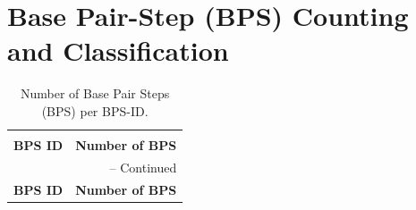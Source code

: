 \section{Base Pair-Step (BPS) Counting and Classification}



\begin{center}
\begin{longtable}{c|c}
\caption{Number of Base Pair Steps (BPS) per BPS-ID.}\\ \hline
\label{tab:bpscount}\\ 
\bf{BPS ID} & \bf{Number of BPS}\\ \hline \hline
\endfirsthead

\multicolumn{2}{r}{{\tablename} \thetable{} -- Continued} \\
\bf{BPS ID} & \bf{Number of BPS}\\ \hline \hline
\endhead


\end{longtable}
\end{center}
